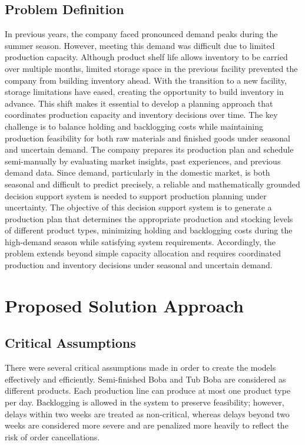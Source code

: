 \documentclass[nocoverpage]{buIE47xbooklet}
\begin{document}
\subsection{Problem Definition}
In previous years, the company faced pronounced demand peaks during the summer season. However, meeting this demand was difficult due to limited production capacity. Although product shelf life allows inventory to be carried over multiple months, limited storage space in the previous facility prevented the company from building inventory ahead. With the transition to a new facility, storage limitations have eased, creating the opportunity to build inventory in advance. This shift makes it essential to develop a planning approach that coordinates production capacity and inventory decisions over time. The key challenge is to balance holding and backlogging costs while maintaining production feasibility for both raw materials and finished goods under seasonal and uncertain demand. The company prepares its production plan and schedule semi-manually by evaluating market insights, past experiences, and previous demand data. Since demand, particularly in the domestic market, is both seasonal and difficult to predict precisely, a reliable and mathematically grounded decision support system is needed to support production planning under uncertainty. The objective of this decision support system is to generate a production plan that determines the appropriate production and stocking levels of different product types, minimizing holding and backlogging costs during the high-demand season while satisfying system requirements. Accordingly, the problem extends beyond simple capacity allocation and requires coordinated production and inventory decisions under seasonal and uncertain demand.
\section{Proposed Solution Approach}

\subsection{Critical Assumptions}
There were several critical assumptions made in order to create the models effectively and efficiently. Semi-finished Boba and Tub Boba are considered as different products. Each production line can produce at most one product type per day. Backlogging is allowed in the system to preserve feasibility; however, delays within two weeks are treated as non-critical, whereas delays beyond two weeks are considered more severe and are penalized more heavily to reflect the risk of order cancellations. 
\end{document}
